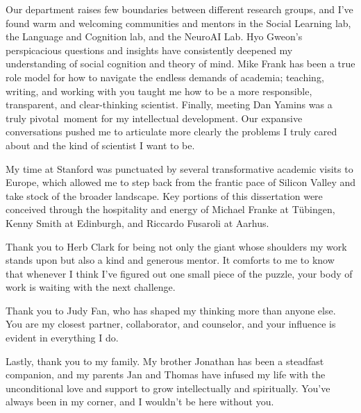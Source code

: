 Our department raises few boundaries between different research groups, and I've found warm and welcoming communities and mentors in the Social Learning lab, the Language and Cognition lab, and the NeuroAI Lab. 
Hyo Gweon's perspicacious questions and insights have consistently deepened my understanding of social cognition and theory of mind. 
Mike Frank has been a true role model for how to navigate the endless demands of academia; teaching, writing, and working with you taught me how to be a more responsible, transparent, and clear-thinking scientist.
Finally, meeting Dan Yamins was a truly pivotal moment for my intellectual development.
Our expansive conversations pushed me to articulate more clearly the problems I truly cared about and the kind of scientist I want to be.


My time at Stanford was punctuated by several transformative academic visits to Europe, which allowed me to step back from the frantic pace of Silicon Valley and take stock of the broader landscape.
Key portions of this dissertation were conceived through the hospitality and energy of Michael Franke at T\"ubingen, Kenny Smith at Edinburgh, and Riccardo Fusaroli at Aarhus.

Thank you to Herb Clark for being not only the giant whose shoulders my work stands upon but also a kind and generous mentor.
It comforts to me to know that whenever I think I've figured out one small piece of the puzzle, your body of work is waiting with the next challenge. 

Thank you to Judy Fan, who has shaped my thinking more than anyone else. You are my closest partner, collaborator, and counselor, and your influence is evident in everything I do.

Lastly, thank you to my family. My brother Jonathan has been a steadfast companion, and my parents Jan and Thomas have infused my life with the unconditional love and support to grow intellectually and spiritually. You've always been in my corner, and I wouldn't be here without you.
